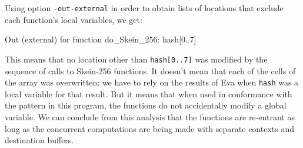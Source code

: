 \documentclass[web]{frama-c-book}
\newcommand{\Eva}{\textsf{Eva}}
\begin{document}
Using option \verb|-out-external| in order to obtain lists of 
locations that exclude each function's local variables, we get:
\begin{logs}
[inout] Out (external) for function do_Skein_256:
          hash[0..7]
\end{logs}
This means that no location other than \lstinline|hash[0..7]| was
modified by the sequence of calls to Skein-256 functions. It doesn't
mean that each of the cells of the array was overwritten: we have to
rely on the results of \Eva{} when \lstinline|hash| was a
local variable for that result. But it means that when used in
conformance with the pattern in this program, the functions do not
accidentally modify a global variable. We can conclude from this 
analysis that the functions are re-entrant as long as the concurrent
computations are being made with separate contexts and destination
buffers.
\end{document}

